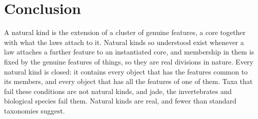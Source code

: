 \documentclass{situationist-preprint}
\begin{document}
\section{Conclusion}\label{s:conclusion}

A natural kind is the extension of a cluster of genuine features, a core together with what the laws attach to it. Natural kinds so understood exist whenever a law attaches a further feature to an instantiated core, and membership in them is fixed by the genuine features of things, so they are real divisions in nature. Every natural kind is closed: it contains every object that has the features common to its members, and every object that has all the features of one of them. Taxa that fail these conditions are not natural kinds, and jade, the invertebrates and biological species fail them. Natural kinds are real, and fewer than standard taxonomies suggest.
\end{document}

